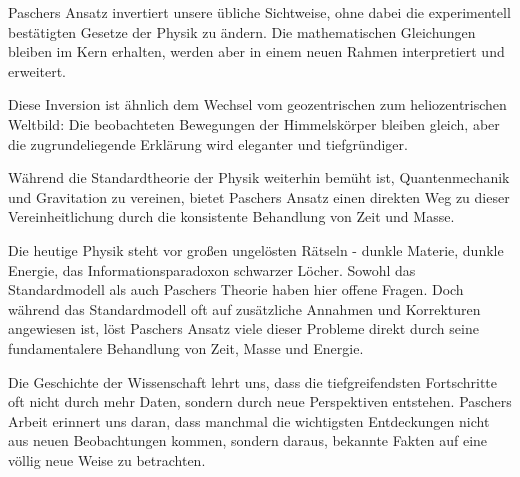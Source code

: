 \documentclass[a4paper,12pt]{article}
\begin{document}
	Paschers Ansatz invertiert unsere übliche Sichtweise, ohne dabei die experimentell bestätigten Gesetze der Physik zu ändern. Die mathematischen Gleichungen bleiben im Kern erhalten, werden aber in einem neuen Rahmen interpretiert und erweitert.
	
	Diese Inversion ist ähnlich dem Wechsel vom geozentrischen zum heliozentrischen Weltbild: Die beobachteten Bewegungen der Himmelskörper bleiben gleich, aber die zugrundeliegende Erklärung wird eleganter und tiefgründiger.
	
	Während die Standardtheorie der Physik weiterhin bemüht ist, Quantenmechanik und Gravitation zu vereinen, bietet Paschers Ansatz einen direkten Weg zu dieser Vereinheitlichung durch die konsistente Behandlung von Zeit und Masse.
	
	Die heutige Physik steht vor großen ungelösten Rätseln - dunkle Materie, dunkle Energie, das Informationsparadoxon schwarzer Löcher. Sowohl das Standardmodell als auch Paschers Theorie haben hier offene Fragen. Doch während das Standardmodell oft auf zusätzliche Annahmen und Korrekturen angewiesen ist, löst Paschers Ansatz viele dieser Probleme direkt durch seine fundamentalere Behandlung von Zeit, Masse und Energie.
	
	Die Geschichte der Wissenschaft lehrt uns, dass die tiefgreifendsten Fortschritte oft nicht durch mehr Daten, sondern durch neue Perspektiven entstehen. Paschers Arbeit erinnert uns daran, dass manchmal die wichtigsten Entdeckungen nicht aus neuen Beobachtungen kommen, sondern daraus, bekannte Fakten auf eine völlig neue Weise zu betrachten.
	
\end{document}
